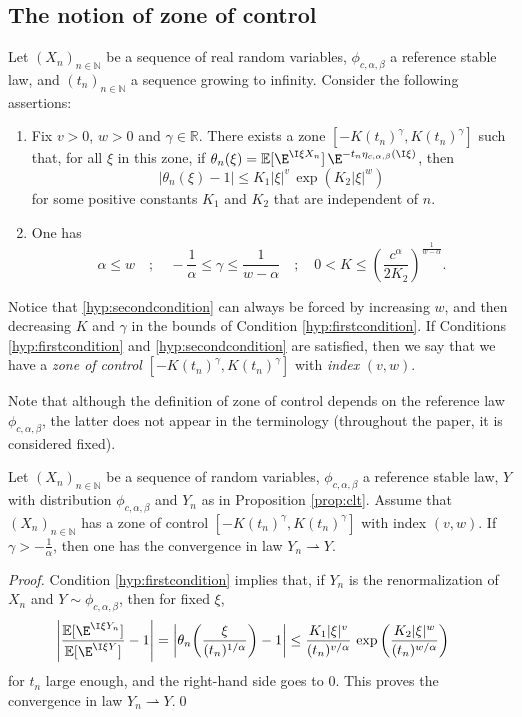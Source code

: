 \documentclass[envcountsame]{svmult}
\newcommand{\N}{\mathbb{N}}
\newcommand{\R}{\mathbb{R}}
\newcommand{\esper}{\mathbb{E}}
\begin{document}
\subsection{The notion of zone of control}\label{sec:zone}

\begin{definition}\label{def:zone}
Let $(X_n)_{n \in \N}$ be a sequence of real random variables, $\phi_{c,\alpha,\beta}$ a reference stable law, and $(t_n)_{n \in \N}$ a sequence growing to infinity. Consider the following assertions:
\begin{enumerate}[label=(Z\arabic*)]
\item\label{hyp:firstcondition} Fix $v > 0$, $w > 0$ and $\gamma \in \R$. There exists a zone $[-K(t_n)^\gamma,K(t_n)^\gamma]$ such that, for all $\xi$ in this zone, if $\theta_n(\xi) = \esper[\E^{\I \xi X_n}]\,\E^{-t_n \eta_{c,\alpha,\beta}(\I\xi)}$, then
 $$|\theta_n(\xi)-1| \leq K_1|\xi|^v\,\exp(K_2|\xi|^w)$$ for some positive constants $K_1$ and $K_2$ that are independent of $n$.
\item\label{hyp:secondcondition} One has 
$$\alpha \leq w \quad;\quad -\frac{1}{\alpha}\leq  \gamma \leq \frac{1}{w-\alpha}\quad;\quad 0<K \leq \left(\frac{c^\alpha}{2K_2}\right)^{\frac{1}{w-\alpha}}.$$ 
\end{enumerate}
Notice that \ref{hyp:secondcondition} can always be forced by increasing $w$, and then decreasing $K$ and $\gamma$ in the bounds of Condition \ref{hyp:firstcondition}. If Conditions \ref{hyp:firstcondition} and \ref{hyp:secondcondition} are satisfied, then we say that we have a \emph{zone of control} $[-K(t_n)^\gamma,K(t_n)^\gamma]$ with \emph{index} $(v,w)$. 
\end{definition}
Note that although the definition of zone of control depends on 
the reference law $\phi_{c,\alpha,\beta}$,
the latter does not appear in the terminology
(throughout the paper, it is considered fixed).


\begin{proposition}\label{prop:zone_CLT}
Let $(X_n)_{n \in \N}$ be a sequence of random variables, $\phi_{c,\alpha,\beta}$ a reference stable law, $Y$ with distribution $\phi_{c,\alpha,\beta}$ and $Y_n$ as in Proposition \ref{prop:clt}.
Assume that $(X_n)_{n \in \N}$ has a zone of control $[-K(t_n)^\gamma,K(t_n)^\gamma]$ with index $(v,w)$.
If $\gamma>-\frac{1}{\alpha}$, then one has the convergence in law $Y_n \rightharpoonup Y$.
\end{proposition}

\begin{proof}
Condition \ref{hyp:firstcondition} implies that, if $Y_n$ is the renormalization of $X_n$ and $Y \sim \phi_{c,\alpha,\beta}$, then for fixed $\xi$,
\begin{align*}
\left|\frac{\esper[\E^{\I \xi Y_n}]}{\esper[\E^{\I \xi Y}]}-1\right| &= \left|\theta_n\!\left(\frac{\xi}{(t_n)^{1/\alpha}}\right)-1\right| \leq  \frac{K_1|\xi|^v}{(t_n)^{v/\alpha}}\,\exp\left(\frac{K_2|\xi|^w}{(t_n)^{w/\alpha}}\right)
\end{align*}
for $t_n$ large enough, and the right-hand side goes to $0$. This proves the convergence in law $Y_n \rightharpoonup Y$.\qed
\end{proof}
\end{document}
